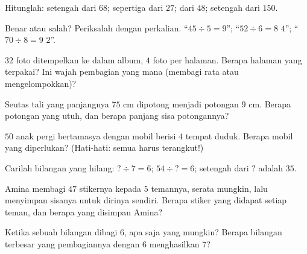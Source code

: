 \begin{exercise}[$\star$]\label{exo:g3:division:4}
Hitunglah: setengah dari $68$; sepertiga dari $27$;  dari
$48$; setengah dari $150$.
\end{exercise}

\begin{exercise}[$\star$]\label{exo:g3:division:5}
Benar atau salah? Periksalah dengan perkalian.
``$45 \div 5 = 9$''; \quad ``$52 \div 6 = 8$  $4$'';
\quad ``$70 \div 8 = 9$  $2$''.
\end{exercise}

\begin{exercise}[$\star$]\label{exo:g3:division:6}
$32$ foto ditempelkan ke dalam album, $4$ foto per halaman. Berapa
halaman yang terpakai? Ini wajah pembagian yang mana (membagi rata atau mengelompokkan)?
\end{exercise}

\begin{exercise}[$\star$]\label{exo:g3:division:7}
Seutas tali yang panjangnya $75$ cm dipotong menjadi potongan $9$ cm.
Berapa potongan yang utuh, dan berapa panjang sisa potongannya?
\end{exercise}

\begin{exercise}[$\star$]\label{exo:g3:division:8}
$50$ anak pergi bertamasya dengan mobil berisi $4$ tempat duduk.
Berapa mobil yang diperlukan? (Hati-hati: semua harus terangkut!)
\end{exercise}

\begin{exercise}[$\star$]\label{exo:g3:division:9}
Carilah bilangan yang hilang: $? \div 7 = 6$; \quad
$54 \div ? = 6$; \quad setengah dari $?$ adalah $35$.
\end{exercise}

\begin{exercise}[$\star\star$]\label{exo:g3:division:10}
Amina membagi $47$ stikernya kepada $5$ temannya, serata mungkin,
lalu menyimpan sisanya untuk dirinya sendiri. Berapa stiker yang
didapat setiap teman, dan berapa yang disimpan Amina?
\end{exercise}

\begin{exercise}[$\star\star$]\label{exo:g3:division:11}
Ketika sebuah bilangan dibagi $6$,  apa saja yang mungkin?
Berapa bilangan terbesar yang pembagiannya dengan $6$ menghasilkan
 $7$?

\end{exercise}
